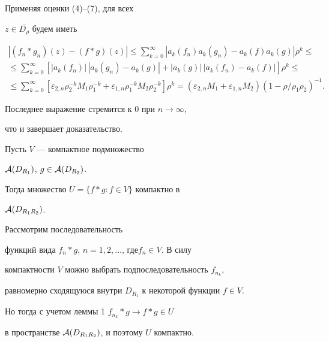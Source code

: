 \begin{pf}
Применяя оценки (4)--(7), для  всех


$z \in \overline{D_{\rho}}$ будем иметь


\begin{multline*}


|(f_n *g_n )(z) - (f*g)(z)| \le 


\sum_{k=0}^{\infty} |a_k (f_n )a_k (g_n )-a_k(f)a_k(g)| \rho^k \le \\


%


\le\sum_{k=0}^{\infty} [|a_k (f_n)|\, |a_k (g_n )-a_k (g)| + 


|a_k (g)|\, |a_k (f_n) - a_k (f)|] \rho^k \le \\


%


\le\sum_{k=0}^{\infty} [\varepsilon_{2,n} \rho_2^{-k} M_1 \rho_1^{-k} 


+ \varepsilon_{1,n} \rho_1^{-k} M_2 \rho_2^{-k} ] \rho^k = 


(\varepsilon_{2,n} M_1 + \varepsilon_{1,n} M_2)(1-\rho/\rho_1 \rho_2)^{-1}.


\end{multline*}


Последнее выражение стремится к 0 при $n \to\infty$, 


что и завершает доказательство.


\end{pf}





\begin{lem}


Пусть $V$ --- компактное подмножество 


${\cal A}(D_{R_1})$, $g \in {\cal A}(D_{R_2})$.


Тогда множество $U= \{ f*g: f \in V \}$ компактно в 


${\cal A}(D_{R_1 R_2})$.


\end{lem}





\begin{pf}


Рассмотрим последовательность


функций вида $f_n *g$, $n=1,2,\dotsc$, где\linebreak $f_n \in V$. В силу 


компактности $V$ можно выбрать подпоследовательность $f_{n_k}$, 


равномерно сходящуюся внутри $D_{R_1}$ к некоторой функции $f \in V$. 


Но тогда с учетом леммы 1\; $f_{n_k} * g \to f*g \in U$ 


в пространстве ${\cal A}(D_{R_1 R_2})$, и поэтому $U$ компактно.


\end{pf}





